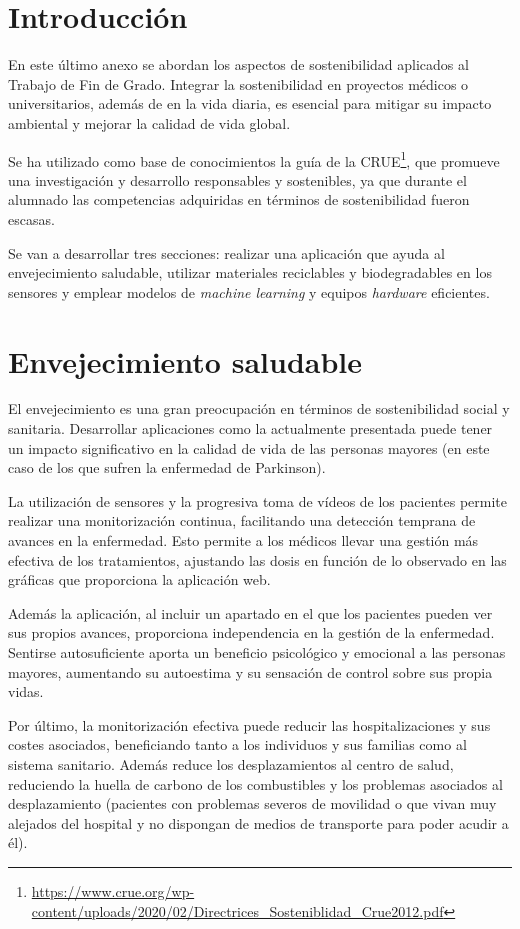 
\section{Introducción}
En este último anexo se abordan los aspectos de sostenibilidad aplicados al Trabajo de Fin de Grado. Integrar la sostenibilidad en proyectos médicos o universitarios, además de en la vida diaria, es esencial para mitigar su impacto ambiental y mejorar la calidad de vida global.

Se ha utilizado como base de conocimientos la guía de la CRUE\footnote{\url{https://www.crue.org/wp-content/uploads/2020/02/Directrices_Sosteniblidad_Crue2012.pdf}}, que promueve una investigación y desarrollo responsables y sostenibles, ya que durante el alumnado las competencias adquiridas en términos de sostenibilidad fueron escasas.

Se van a desarrollar tres secciones: realizar una aplicación que ayuda al envejecimiento saludable, utilizar materiales reciclables y biodegradables en los sensores y emplear modelos de \textit{machine learning} y equipos \textit{hardware} eficientes.


\section{Envejecimiento saludable}
El envejecimiento es una gran preocupación en términos de sostenibilidad social y sanitaria. Desarrollar aplicaciones como la actualmente presentada puede tener un impacto significativo en la calidad de vida de las personas mayores (en este caso de los que sufren la enfermedad de Parkinson).

La utilización de sensores y la progresiva toma de vídeos de los pacientes permite realizar una monitorización continua, facilitando una detección temprana de avances en la enfermedad. Esto permite a los médicos llevar una gestión más efectiva de los tratamientos, ajustando las dosis en función de lo observado en las gráficas que proporciona la aplicación web.

Además la aplicación, al incluir un apartado en el que los pacientes pueden ver sus propios avances, proporciona independencia en la gestión de la enfermedad. Sentirse autosuficiente aporta un beneficio psicológico y emocional a las personas mayores, aumentando su autoestima y su sensación de control sobre sus propia vidas.

Por último, la monitorización efectiva puede reducir las hospitalizaciones y sus costes asociados, beneficiando tanto a los individuos y sus familias como al sistema sanitario. Además reduce los desplazamientos al centro de salud, reduciendo la huella de carbono de los combustibles y los problemas asociados al desplazamiento (pacientes con problemas severos de movilidad o que vivan muy alejados del hospital y no dispongan de medios de transporte para poder acudir a él).


